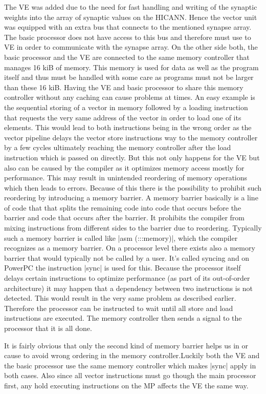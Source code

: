 The VE was added due to the need for fast handling and writing of the synaptic weights into the array of synaptic values on the HICANN.
Hence the vector unit was equipped with an extra bus that connects to the mentioned synapse array.
The basic processor does not have access to this bus and therefore must use to VE in order to communicate with the synapse array.
On the other side both, the basic processor and the VE are connected to the same memory controller that manages 16 kiB of memory.
This memory is used for data as well as the program itself and thus must be handled with some care as programs must not be larger than these 16 kiB.
Having the VE and basic processor to share this memory controller without any caching can cause problems at times.
An easy example is the sequential storing of a vector in memory followed by a loading instruction that requests the very same address of the vector in order to load one of its elements.
This would lead to both instructions being in the wrong order as the vector pipeline delays the vector store instructions way to the memory controller by a few cycles ultimately reaching the memory controller after the load instruction which is passed on directly.
But this not only happens for the VE but also can be caused by the compiler as it optimizes memory access mostly for performance.
This may result in unintended reordering of memory operations which then leads to errors.
Because of this there is the possibility to prohibit such reordering by introducing a memory barrier.
A memory barrier basically is a line of code that that splits the remaining code into code that occurs before the barrier and code that occurs after the barrier.
It prohibits the compiler from mixing instructions from different sides to the barrier due to reordering.
Typically such a memory barrier is called like |asm (:::memory)|, which the compiler recognizes as a memory barrier.
On a processor level there exists also a memory barrier that would typically not be called by a user.
It's called syncing and on PowerPC the instruction |sync| is used for this.
Because the processor itself delays certain instructions to optimize performance (as part of its out-of-order architecture) it may happen that a dependency between two instructions is not detected.
This would result in the very same problem as described earlier.
Therefore the processor can be instructed to wait until all store and load instructions are executed.
The memory controller then sends a signal to the processor that it is all done.

It is fairly obvious that only the second kind of memory barrier helps us in or cause to avoid wrong ordering in the memory controller.Luckily both the VE and the basic processor use the same memory controller which makes |sync| apply in both cases.
Also since all vector instructions must go though the main processor first, any hold executing instructions on the MP affects the VE the same way.

